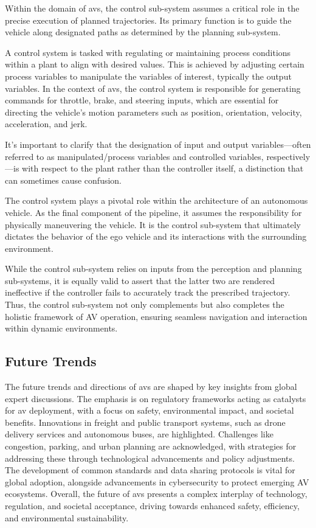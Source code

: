 Within the domain of \glspl{av}, the control sub-system assumes a critical role in the precise execution of planned trajectories. Its primary function is to guide the vehicle along designated paths as determined by the planning sub-system.

A control system is tasked with regulating or maintaining process conditions within a plant to align with desired values. This is achieved by adjusting certain process variables to manipulate the variables of interest, typically the output variables. In the context of \glspl{av}, the control system is responsible for generating commands for throttle, brake, and steering inputs, which are essential for directing the vehicle's motion parameters such as position, orientation, velocity, acceleration, and jerk.

It's important to clarify that the designation of input and output variables—often referred to as manipulated/process variables and controlled variables, respectively—is with respect to the plant rather than the controller itself, a distinction that can sometimes cause confusion.

The control system plays a pivotal role within the architecture of an autonomous vehicle. As the final component of the pipeline, it assumes the responsibility for physically maneuvering the vehicle. It is the control sub-system that ultimately dictates the behavior of the ego vehicle and its interactions with the surrounding environment.

While the control sub-system relies on inputs from the perception and planning sub-systems, it is equally valid to assert that the latter two are rendered ineffective if the controller fails to accurately track the prescribed trajectory. Thus, the control sub-system not only complements but also completes the holistic framework of AV operation, ensuring seamless navigation and interaction within dynamic environments.



  
\subsection{Future Trends}

The future trends and directions of \glspl{av} are shaped by key insights from global expert discussions. The emphasis is on regulatory frameworks acting as catalysts for \gls{av} deployment, with a focus on safety, environmental impact, and societal benefits. Innovations in freight and public transport systems, such as drone delivery services and autonomous buses, are highlighted. Challenges like congestion, parking, and urban planning are acknowledged, with strategies for addressing these through technological advancements and policy adjustments. The development of common standards and data sharing protocols is vital for global adoption, alongside advancements in cybersecurity to protect emerging AV ecosystems. Overall, the future of \glspl{av} presents a complex interplay of technology, regulation, and societal acceptance, driving towards enhanced safety, efficiency, and environmental sustainability.






